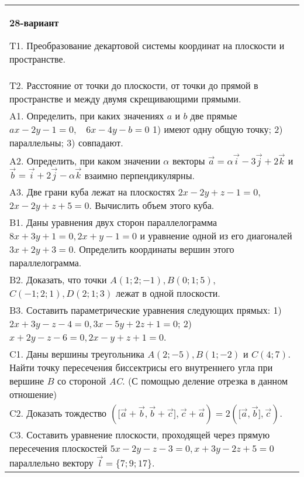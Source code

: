 \documentclass{article}
\begin{document}
\begin{tabular}{m{17cm}}
\textbf{28-вариант}
\newline

T1. 
Преобразование декартовой системы координат на плоскости и пространстве. \\
T2. 
Расстояние от точки до плоскости, от точки до прямой в пространстве и между двумя скрещивающими прямыми. \\
A1. 
Определить, при каких значениях \(a\) и \(b\) две прямые \(ax - 2y - 1 = 0,\ \ \ \ 6x - 4y - b = 0\) 1) имеют одну общую точку; 2) параллельны; 3) совпадают.
 \\
A2. 
Определить, при каком значении \(\alpha\) векторы \(\overrightarrow{a} = \alpha\overrightarrow{i} - 3\overrightarrow{j} + 2\overrightarrow{k}\) и \(\overrightarrow{b} = \overrightarrow{i} + 2\overrightarrow{j} - \alpha\overrightarrow{k}\) взаимно перпендикулярны.
 \\
A3. 
Две грани куба лежат на плоскостях \(2x - 2y + z - 1 = 0,\) \(2x - 2y + z + 5 = 0\). Вычислить объем этого куба.
 \\
B1. 
Даны уравнения двух сторон параллелограмма \(8x + 3y + 1 = 0,2x + y - 1 = 0\) и уравнение одной из его диагоналей \(3x + 2y + 3 = 0\). Определить координаты вершин этого параллелограмма.
 \\
B2. 
Доказать, что точки \(A(1;2; - 1),B(0;1;5)\), \(C( - 1;2;1),D(2;1;3)\) лежат в одной плоскости.
 \\
B3. 
Составить параметрические уравнения следующих прямых: 1) \(2x + 3y - z - 4 = 0,3x - 5y + 2z + 1 = 0\); 2) \(x + 2y - z - 6 = 0,2x - y + z + 1 = 0\).
 \\
C1. 
Даны вершины треугольника \(A(2; - 5),B(1; - 2)\) и \(C(4;7)\). Найти точку пересечения биссектрисы его внутреннего угла при вершине \(B\) со стороной \emph{AC}. (С помощью деление отрезка в данном отношение)
 \\
C2. 
Доказать тождество \((\lbrack\overrightarrow{a} + \overrightarrow{b},\overrightarrow{b} + \overrightarrow{c}\rbrack,\overrightarrow{c} + \overrightarrow{a}) = 2(\lbrack\overrightarrow{a},\overrightarrow{b}\rbrack,\overrightarrow{c})\).
 \\
C3. 
Составить уравнение плоскости, проходящей через прямую пересечения плоскостей \(5x - 2y - z - 3 = 0,x + 3y - 2z + 5 = 0\) параллельно вектору \(\overrightarrow{l} = \{ 7;9;17\}\).
 \\

\end{tabular}
\vspace{1cm}
\end{document}
